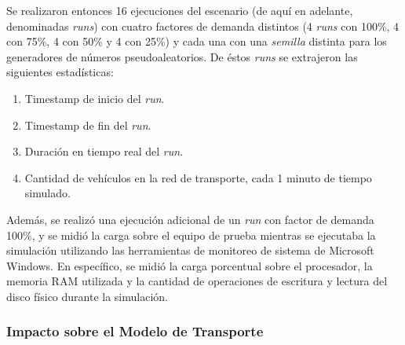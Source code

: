 Se realizaron entonces 16 ejecuciones del escenario (de aquí en adelante, denominadas \emph{runs}) con cuatro factores de demanda distintos (4 \emph{runs} con 100\%, 4 con 75\%, 4 con 50\% y 4 con 25\%) y cada una con una \emph{semilla} distinta para los generadores de números pseudoaleatorios. De éstos \emph{runs} se extrajeron las siguientes estadísticas:

\begin{enumerate}
    \item Timestamp de inicio del \emph{run}.
    \item Timestamp de fin del \emph{run}.
    \item Duración en tiempo real del \emph{run}.
    \item Cantidad de vehículos en la red de transporte, cada 1 minuto de tiempo simulado.
\end{enumerate}

Además, se realizó una ejecución adicional de un \emph{run} con factor de demanda 100\%, y se midió la carga sobre el equipo de prueba mientras se ejecutaba la simulación utilizando las herramientas de monitoreo de sistema de Microsoft Windows. En específico, se midió la carga porcentual sobre el procesador, la memoria RAM utilizada y la cantidad de operaciones de escritura y lectura del disco físico durante la simulación. 

\subsubsection{Impacto sobre el Modelo de Transporte}